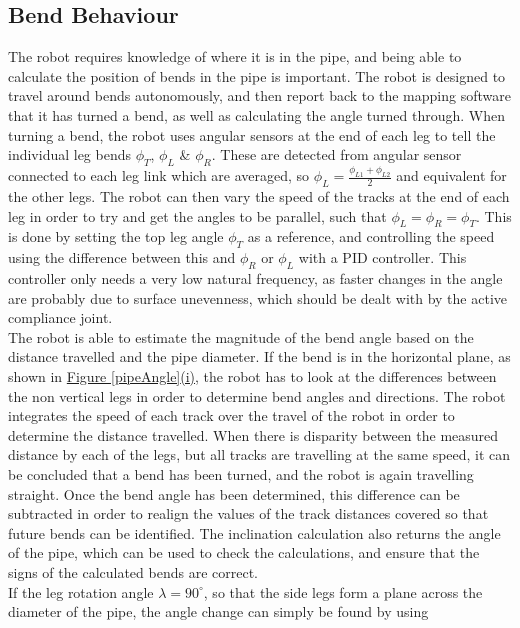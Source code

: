 \documentclass[11pt]{article}		%
\begin{document}
		\subsection{Bend Behaviour}
		
		The robot requires knowledge of where it is in the pipe, and being able to calculate the position of bends in the pipe is important.
		The robot is designed to travel around bends autonomously, and then report back to the mapping software that it has turned a bend, as well as calculating the angle turned through.
		When turning a bend, the robot uses angular sensors at the end of each leg to tell the individual leg bends $\phi_T$, $\phi_L$ \& $\phi_R$.
		These are detected from angular sensor connected to each leg link which are averaged, so $\phi_L = \frac{\phi_{L1} + \phi_{L2}}{2}$ and equivalent for the other legs.
		The robot can then vary the speed of the tracks at the end of each leg in order to try and get the angles to be parallel, such that $\phi_L = \phi_R = \phi_T$.
		This is done by setting the top leg angle $\phi_T$ as a reference, and controlling the speed using the difference between this and $\phi_R$ or $\phi_L$ with a PID controller.
		This controller only needs a very low natural frequency, as faster changes in the angle are probably due to surface unevenness, which should be dealt with by the active compliance joint.
		\\
		The robot is able to estimate the magnitude of the bend angle based on the distance travelled and the pipe diameter.
		If the bend is in the horizontal plane, as shown in \hyperref[pipeAngle]{Figure \ref*{pipeAngle}(i)}, the robot has to look at the differences between the non vertical legs in order to determine bend angles and directions.
		The robot integrates the speed of each track over the travel of the robot in order to determine the distance travelled.
		When there is disparity between the measured distance by each of the legs, but all tracks are travelling at the same speed, it can be concluded that a bend has been turned, and the robot is again travelling straight.
		Once the bend angle has been determined, this difference can be subtracted in order to realign the values of the track distances covered so that future bends can be identified.
		The inclination calculation also returns the angle of the pipe, which can be used to check the calculations, and ensure that the signs of the calculated bends are correct.
		\\
		If the leg rotation angle $\lambda = 90^\circ$, so that the side legs form a plane across the diameter of the pipe, the angle change can simply be found by using
\end{document}
